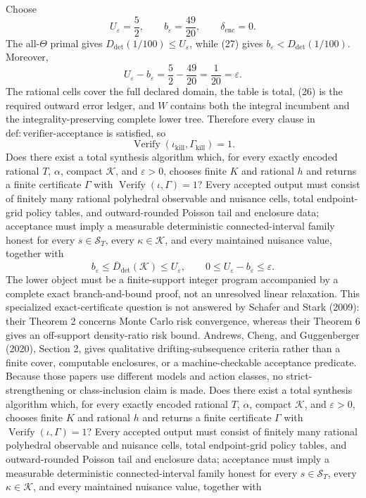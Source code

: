 Choose
\[
 U_\varepsilon=\frac52,\qquad b_\varepsilon=\frac{49}{20},
 \qquad \delta_{\mathrm{enc}}=0.
\tag{29}
\]
The all-\(\Theta\) primal gives \(D_{\mathrm{det}}(1/100)\le U_\varepsilon\), while (27) gives \(b_\varepsilon<D_{\mathrm{det}}(1/100)\). Moreover,
\[
 U_\varepsilon-b_\varepsilon=\frac52-\frac{49}{20}=\frac1{20}=\varepsilon.
\tag{30}
\]
The rational cells cover the full declared domain, the table is total, (26) is the required outward error ledger, and \(W\) contains both the integral incumbent and the integrality-preserving complete lower tree. Therefore every clause in \(\mathrm{def{:}verifier\text{-}acceptance}\) is satisfied, so
\[
 \operatorname{Verify}(\iota_{\mathrm{kill}},\Gamma_{\mathrm{kill}})=1.
\]
Does there exist a total synthesis algorithm which, for every exactly encoded rational \(T\), \(\alpha\), compact \(\mathcal K\), and \(\varepsilon>0\), chooses finite \(K\) and rational \(h\) and returns a finite certificate \(\Gamma\) with \(\operatorname{Verify}(\iota,\Gamma)=1\)? Every accepted output must consist of finitely many rational polyhedral observable and nuisance cells, total endpoint-grid policy tables, and outward-rounded Poisson tail and enclosure data; acceptance must imply a measurable deterministic connected-interval family honest for every \(s\in\mathcal S_T\), every \(\kappa\in\mathcal K\), and every maintained nuisance value, together with
\[
 b_\varepsilon\le\overline D_{\mathrm{det}}(\mathcal K)\le U_\varepsilon,
 \qquad 0\le U_\varepsilon-b_\varepsilon\le\varepsilon.
\]
The lower object must be a finite-support integer program accompanied by a complete exact branch-and-bound proof, not an unresolved linear relaxation. This specialized exact-certificate question is not answered by Schafer and Stark (2009): their Theorem 2 concerns Monte Carlo risk convergence, whereas their Theorem 6 gives an off-support density-ratio risk bound. Andrews, Cheng, and Guggenberger (2020), Section 2, gives qualitative drifting-subsequence criteria rather than a finite cover, computable enclosures, or a machine-checkable acceptance predicate. Because those papers use different models and action classes, no strict-strengthening or class-inclusion claim is made.
Does there exist a total synthesis algorithm which, for every exactly encoded rational \(T\), \(\alpha\), compact \(\mathcal K\), and \(\varepsilon>0\), chooses finite \(K\) and rational \(h\) and returns a finite certificate \(\Gamma\) with \(\operatorname{Verify}(\iota,\Gamma)=1\)? Every accepted output must consist of finitely many rational polyhedral observable and nuisance cells, total endpoint-grid policy tables, and outward-rounded Poisson tail and enclosure data; acceptance must imply a measurable deterministic connected-interval family honest for every \(s\in\mathcal S_T\), every \(\kappa\in\mathcal K\), and every maintained nuisance value, together with
